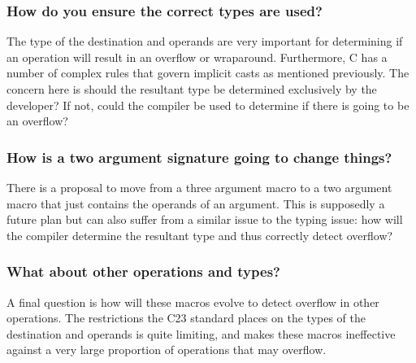 \subsubsection{How do you ensure the correct types are used?}

The type of the destination and operands are very important for determining if an operation will result in an overflow or wraparound. Furthermore, C has a number of complex rules that govern implicit casts as mentioned previously. The concern here is should the resultant type be determined exclusively by the developer? If not, could the compiler be used to determine if there is going to be an overflow?

\subsubsection{How is a two argument signature going to change things?}

There is a proposal to move from a three argument macro to a two argument macro that just contains the operands of an argument. This is supposedly a future plan but can also suffer from a similar issue to the typing issue: how will the compiler determine the resultant type and thus correctly detect overflow?

\subsubsection{What about other operations and types?}

A final question is how will these macros evolve to detect overflow in other operations. The restrictions the C23 standard places on the types of the destination and operands is quite limiting, and makes these macros ineffective against a very large proportion of operations that may overflow.